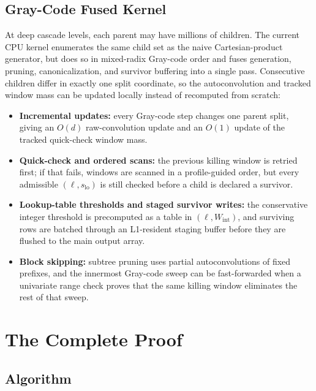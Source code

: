 \documentclass[11pt, letterpaper]{article}
\theoremstyle{paperplain}
\theoremstyle{paperdef}
\begin{document}
\subsection{Gray-Code Fused Kernel}

At deep cascade levels, each parent may have millions of children.
The current CPU kernel enumerates the same child set as the naive
Cartesian-product generator, but does so in mixed-radix Gray-code
order and fuses generation, pruning, canonicalization, and survivor
buffering into a single pass.  Consecutive children differ in exactly
one split coordinate, so the autoconvolution and tracked window mass
can be updated locally instead of recomputed from scratch:

\begin{itemize}
  \item \textbf{Incremental updates:} every Gray-code step changes one
    parent split, giving an $O(d)$ raw-convolution update and an
    $O(1)$ update of the tracked quick-check window mass.
  \item \textbf{Quick-check and ordered scans:} the previous killing
    window is retried first; if that fails, windows are scanned in a
    profile-guided order, but every admissible
    $(\ell,s_{\mathrm{lo}})$ is still checked before a child is
    declared a survivor.
  \item \textbf{Lookup-table thresholds and staged survivor writes:}
    the conservative integer threshold is precomputed as a table in
    $(\ell,W_{\mathrm{int}})$, and surviving rows are batched through
    an L1-resident staging buffer before they are flushed to the main
    output array.
  \item \textbf{Block skipping:} subtree pruning uses partial
    autoconvolutions of fixed prefixes, and the innermost Gray-code
    sweep can be fast-forwarded when a univariate range check proves
    that the same killing window eliminates the rest of that sweep.
\end{itemize}


\section{The Complete Proof}\label{sec:algorithm}

\subsection{Algorithm}
\end{document}
